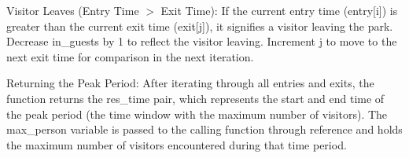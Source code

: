 \begin{DoxyEnumerate}
\item Visitor Leaves (Entry Time \texorpdfstring{$>$}{>} Exit Time)\+: If the current entry time (entry\mbox{[}i\mbox{]}) is greater than the current exit time (exit\mbox{[}j\mbox{]}), it signifies a visitor leaving the park. Decrease in\+\_\+guests by 1 to reflect the visitor leaving. Increment j to move to the next exit time for comparison in the next iteration.
\item Returning the Peak Period\+: After iterating through all entries and exits, the function returns the res\+\_\+time pair, which represents the start and end time of the peak period (the time window with the maximum number of visitors). The max\+\_\+person variable is passed to the calling function through reference and holds the maximum number of visitors encountered during that time period. 
\end{DoxyEnumerate}